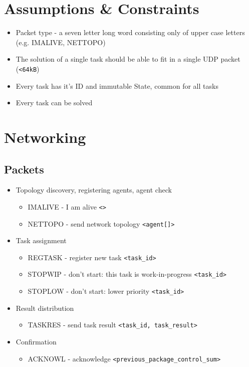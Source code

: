 \documentclass{article}
\begin{document}
\section{Assumptions \& Constraints}
\begin{itemize}
    \item Packet type - a seven letter long word consisting only of upper case letters (e.g. IMALIVE, NETTOPO)
    \item The solution of a single task should be able to fit in a single UDP packet (\verb!<64kB!)
    \item Every task has it's ID and immutable State, common for all tasks
    \item Every task can be solved
\end{itemize}

\section{Networking}
\subsection{Packets}

\begin{itemize}
    \item Topology discovery, registering agents, agent check
    \begin{itemize}
        \item IMALIVE - I am alive \verb!<>!
        \item NETTOPO - send network topology \verb!<agent[]>!
    \end{itemize}
    \item Task assignment
    \begin{itemize}
        \item REGTASK - register new task \verb!<task_id>!
        \item STOPWIP - don't start: this task is work-in-progress \verb!<task_id>!
        \item STOPLOW - don't start: lower priority \verb!<task_id>!
    \end{itemize}
    \item Result distribution
    \begin{itemize}
        \item TASKRES - send task result \verb!<task_id, task_result>!
    \end{itemize}
    \item Confirmation
    \begin{itemize}
        \item ACKNOWL - acknowledge \verb!<previous_package_control_sum>!
    \end{itemize}
\end{itemize}
\end{document}
